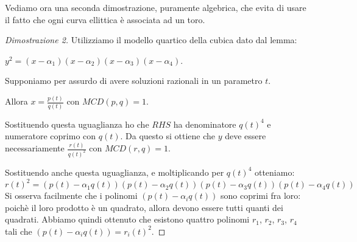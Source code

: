 Vediamo ora una seconda dimostrazione, puramente algebrica, che evita di usare il fatto che ogni curva ellittica è associata ad un toro.
\begin{proof}[Dimostrazione 2]
Utilizziamo il modello quartico della cubica dato dal lemma:

$y^2=(x-\alpha_1)(x-\alpha_2)(x-\alpha_3)(x-\alpha_4)$.

Supponiamo per assurdo di avere soluzioni razionali in un parametro $t$.

Allora $x=\frac{p(t)}{q(t)}$ con $MCD(p,q)=1$.

Sostituendo questa uguaglianza ho che $RHS$ ha denominatore $q(t)^4$ e numeratore coprimo con $q(t)$.
Da questo si ottiene che $y$ deve essere necessariamente $\frac{r(t)}{q(t)^2}$ con $MCD(r,q)=1$.


Sostituendo anche questa uguaglianza, e moltiplicando per $q(t)^4$ otteniamo:
$$r(t)^2=(p(t)-\alpha_1q(t))(p(t)-\alpha_2q(t))(p(t)-\alpha_3q(t))(p(t)-\alpha_4q(t))$$
Si osserva facilmente che i polinomi $(p(t)-\alpha_i q(t))$ sono coprimi fra loro: poichè il loro prodotto è un quadrato, allora devono essere tutti quanti dei quadrati. Abbiamo quindi ottenuto che esistono quattro polinomi $r_1$, $r_2$, $r_3$, $r_4$ tali che $(p(t)-\alpha_iq(t))=r_i(t)^2$.


\end{proof}
